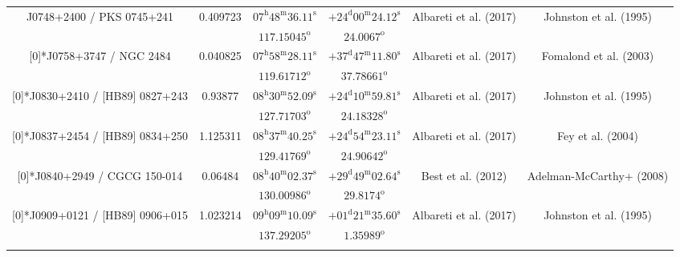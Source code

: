\begin{landscape}
\begin{longtable}{cccccc}
  \multirow{2}[0]{*}{J0748+2400 / PKS 0745+241} & \multirow{2}[0]{*}{0.409723} &  
    $07^\text{h}48^\text{m}36.11^\text{s}$  & $+24^\text{d}00^\text{m}24.12^\text{s}$  & 
    \multirow{2}[0]{*}{Albareti et al. (2017) \cite{RedRef9_2017}}& \multirow{2}[0]{*}{Johnston et al. (1995) \cite{CoordRef0_1995}} \\*
    & & $ 117.15045 ^\text{o}$ & $ 24.0067 ^\text{o}$ & & \\ \addlinespace 
 \multirow{2}[0]{*}{J0758+3747 / NGC 2484} & \multirow{2}[0]{*}{0.040825} &  
    $ 07^\text{h}58^\text{m}28.11^\text{s}$  & $+37^\text{d}47^\text{m}11.80^\text{s}$  & 
    \multirow{2}[0]{*}{Albareti et al. (2017) \cite{RedRef9_2017}}& \multirow{2}[0]{*}{Fomalond et al. (2003) \cite{CoordRef25_2003}} \\*
    & & $ 119.61712 ^\text{o}$ & $ 37.78661 ^\text{o}$ & & \\ \addlinespace 
 \multirow{2}[0]{*}{J0830+2410 / [HB89] 0827+243} & \multirow{2}[0]{*}{0.93877} &  
    $08^\text{h}30^\text{m}52.09^\text{s}$  & $+24^\text{d}10^\text{m}59.81^\text{s}$  & 
    \multirow{2}[0]{*}{Albareti et al. (2017) \cite{RedRef9_2017}}& \multirow{2}[0]{*}{Johnston et al. (1995) \cite{CoordRef0_1995}} \\*
    & & $ 127.71703 ^\text{o}$ & $ 24.18328 ^\text{o}$ & & \\ \addlinespace 
 \multirow{2}[0]{*}{J0837+2454 / [HB89] 0834+250} & \multirow{2}[0]{*}{1.125311} &  
    $08^\text{h}37^\text{m}40.25^\text{s}$  & $+24^\text{d}54^\text{m}23.11^\text{s}$  & 
    \multirow{2}[0]{*}{Albareti et al. (2017) \cite{RedRef9_2017}}& \multirow{2}[0]{*}{Fey et al. (2004) \cite{CoordRef2_2004}} \\*
    & & $ 129.41769 ^\text{o}$ & $ 24.90642 ^\text{o}$ & & \\ \addlinespace
 \multirow{2}[0]{*}{J0840+2949 / CGCG 150-014} & \multirow{2}[0]{*}{0.06484} &  
    $ 08^\text{h}40^\text{m}02.37^\text{s}$  & $+29^\text{d}49^\text{m}02.64^\text{s}$  & 
    \multirow{2}[0]{*}{Best et al. (2012) \cite{RedRef28_2012}}& \multirow{2}[0]{*}{Adelman-McCarthy+ (2008) \cite{CoordRef28_2008}} \\*
    & & $ 130.00986 ^\text{o}$ & $ 29.8174 ^\text{o}$ & & \\ \addlinespace 

 \multirow{2}[0]{*}{J0909+0121 / [HB89] 0906+015} & \multirow{2}[0]{*}{1.023214} &  
    $ 09^\text{h}09^\text{m}10.09^\text{s}$  & $+01^\text{d}21^\text{m}35.60^\text{s}$  & 
    \multirow{2}[0]{*}{Albareti et al. (2017) \cite{RedRef9_2017}}& \multirow{2}[0]{*}{Johnston et al. (1995) \cite{CoordRef0_1995}} \\*
    & & $137.29205^\text{o}$ & $1.35989 ^\text{o}$ & & \\ \addlinespace 


\end{longtable}
\end{landscape}
